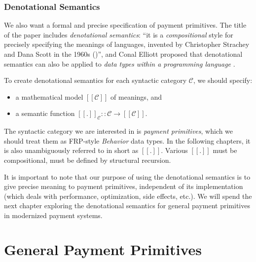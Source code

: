 \subsection{Denotational Semantics}

We also want a formal and precise specification of payment primitives. The title of the paper includes
\textit{denotational semantics}: ``it is a \textit{compositional} style for precisely specifying the meanings of
languages, invented by Christopher Strachey and Dana Scott in the 1960s (\cite{scott1971toward})'', and Conal Elliott
proposed that denotational semantics can also be applied to \textit{data types within a programming language}
.

To create denotational semantics for each syntactic category $\mathcal{C}$, we should specify:

\begin{itemize}
\item a mathematical model $[\![\mathcal{C}]\!]$ of meanings, and
\item a semantic function $[\![.]\!]_{\mathcal{C}} :: \mathcal{C} \rightarrow [\![\mathcal{C}]\!]$.
\end{itemize}

The syntactic category we are interested in is \textit{payment primitives}, which we should treat them as FRP-style
\textit{Behavior} data types. In the following chapters, it is also unambiguously referred to in short as
$[\![.]\!]$. Various $[\![.]\!]$ must be compositional, \ie must be defined by structural recursion.

It is important to note that our purpose of using the denotational semantics is to give precise meaning to payment
primitives, independent of its implementation (which deals with performance, optimization, side effects, etc.). We will
spend the next chapter exploring the denotational semantics for general payment primitives in modernized payment
systems.


\chapter{General Payment Primitives}

